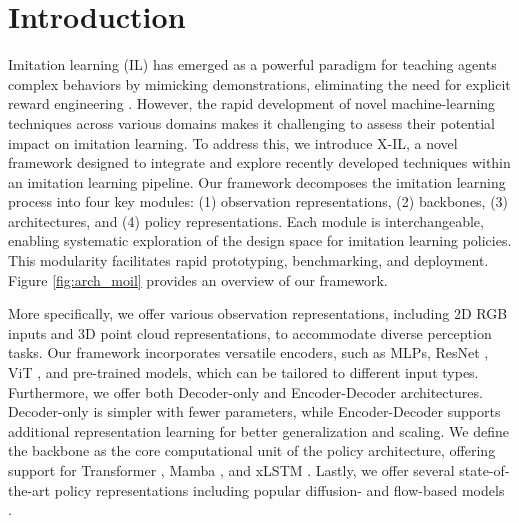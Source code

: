 \section{Introduction}
Imitation learning (IL) \cite{osa2018algorithmic} has emerged as a powerful paradigm for teaching agents complex behaviors by mimicking demonstrations, eliminating the need for explicit reward engineering \cite{argall2009survey}. However, the rapid development of novel machine-learning techniques across various domains makes it challenging to assess their potential impact on imitation learning.
To address this, we introduce X-IL, a novel framework designed to integrate and explore recently developed techniques within an imitation learning pipeline. Our framework decomposes the imitation learning process into four key modules: (1) observation representations, (2) backbones, (3) architectures, and (4) policy representations. Each module is interchangeable, enabling systematic exploration of the design space for imitation learning policies. This modularity facilitates rapid prototyping, benchmarking, and deployment.
Figure \ref{fig:arch_moil} provides an overview of our framework.

More specifically, we offer various observation representations, including 2D RGB inputs and 3D point cloud representations, to accommodate diverse perception tasks. Our framework incorporates versatile encoders, such as MLPs, ResNet \cite{he2015deepresiduallearningimage}, ViT \cite{dosovitskiy2021imageworth16x16words}, and pre-trained models, which can be tailored to different input types. Furthermore, we offer both Decoder-only and Encoder-Decoder architectures. Decoder-only is simpler with fewer parameters, while Encoder-Decoder supports additional representation learning for better generalization and scaling.
We define the backbone as the core computational unit of the policy architecture, offering support for Transformer \cite{vaswani2017attention}, Mamba \cite{gu2024mambalineartimesequencemodeling}, and xLSTM \cite{beck2024xlstmextendedlongshortterm}.
Lastly, we offer several state-of-the-art policy representations including popular diffusion- and flow-based models \cite{ho2020denoising, chi2023diffusion, reuss2023goal,lipman2023flowmatchinggenerativemodeling, du2022toflowefficientcontinuousnormalizing}.

